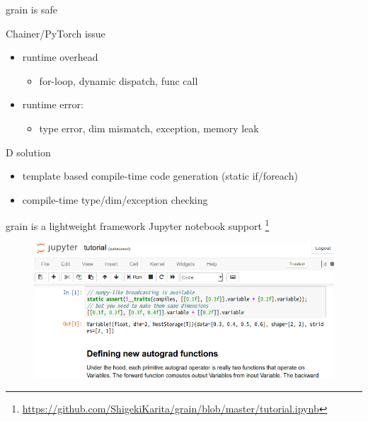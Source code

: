 \documentclass[aspectratio=169,
  14pt,xcolor=dvipsnames,table,professional font,dvipdfmx]{beamer}
\begin{document}
\begin{frame}{grain is \alert{safe}}
  \begin{alertblock}{Chainer/PyTorch issue}
  \begin{itemize}
  \item runtime overhead
    \begin{itemize}
    \item for-loop, dynamic dispatch, func call
    \end{itemize}
  \item runtime error:
    \begin{itemize}
    \item type error, dim mismatch, exception, memory leak
    \end{itemize}
  \end{itemize}
  \end{alertblock}
  \begin{exampleblock}{D solution}
    \begin{itemize}
    \item template based compile-time code generation (static if/foreach)
    \item compile-time type/dim/exception checking
    \end{itemize}
  \end{exampleblock}
\end{frame}

\begin{frame}[fragile]{grain is \alert{a lightweight framework}}
  Jupyter notebook support
  \footnote{\alert{\url{https://github.com/ShigekiKarita/grain/blob/master/tutorial.ipynb}}}
  \begin{figure}[b]
	\centering
	\includegraphics[height=0.6\textheight]{./fig/jupyterd.png}
  \end{figure}
  \scriptsize
\end{frame}
\end{document}
